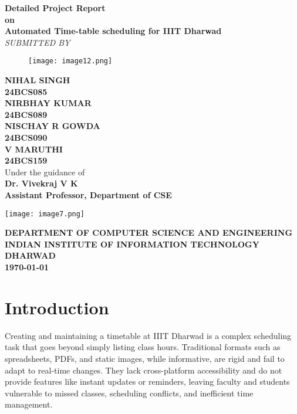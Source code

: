 \documentclass[12pt]{article}
\begin{document}
\begin{center}
    \textbf{Detailed Project Report} \\[0.5cm]
    \textbf{on} \\[0.5cm]
    \textbf{\LARGE Automated Time-table scheduling for IIIT Dharwad} \\[1cm]

    \textit{SUBMITTED BY} \\[0.3cm]
\begin{figure}[H]
    \centering
    \texttt{[image: image12.png]}
    \label{fig:placeholder}
\end{figure}
    \textbf{NIHAL SINGH \\ 24BCS085} \\ [0.4cm]
    \textbf{NIRBHAY KUMAR \\ 24BCS089} \\[0.4cm]
    \textbf{NISCHAY R GOWDA \\ 24BCS090} \\[0.4cm]
    \textbf{V MARUTHI \\ 24BCS159} \\[0.45cm]

    Under the guidance of \\[0.7cm]
    \textbf{Dr. Vivekraj V K} \\[0.3cm]
    \textbf{Assistant Professor, Department of CSE} \\
    \vfill

    \texttt{[image: image7.png]}
    \vfill

    \textbf{DEPARTMENT OF COMPUTER SCIENCE AND ENGINEERING} \\
    \textbf{INDIAN INSTITUTE OF INFORMATION TECHNOLOGY DHARWAD} \\[0.5cm]
    \textbf{\today}
\end{center}

\newpage
\tableofcontents
\newpage
\listoffigures
\newpage
\listoftables
\newpage

\section{Introduction}
Creating and maintaining a timetable at IIIT Dharwad is a complex scheduling task that goes beyond simply listing class hours. Traditional formats such as spreadsheets, PDFs, and static images, while informative, are rigid and fail to adapt to real-time changes. They lack cross-platform accessibility and do not provide features like instant updates or reminders, leaving faculty and students vulnerable to missed classes, scheduling conflicts, and inefficient time management.
\end{document}
